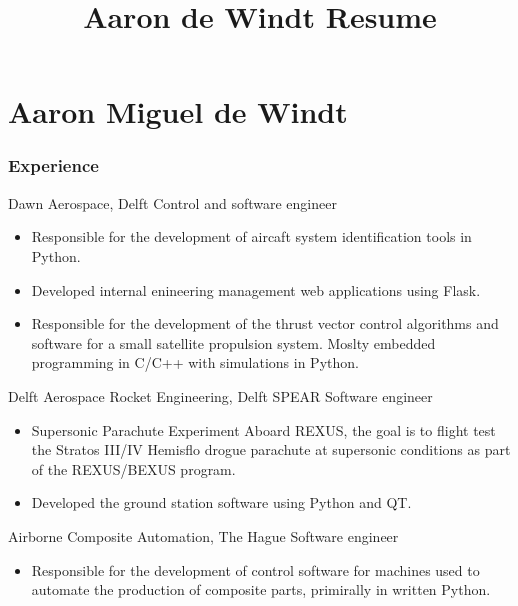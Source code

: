 \documentclass{tccv}
\title{Aaron de Windt Resume}
\begin{document}
\part{Aaron Miguel de Windt}

\section{Experience}

\begin{eventlist}


    {Dawn Aerospace, Delft}
    {Control and software engineer}
\begin{itemize}
   \item{Responsible for the development of aircaft system \linebreak identification tools in Python.}
   \item{Developed internal enineering management web applications using Flask.}
   \item{Responsible for the development of the thrust vector control algorithms and software for a small satellite propulsion system. Moslty embedded programming in C/C++ with simulations in Python.}
\end{itemize}

     {Delft Aerospace Rocket Engineering, Delft}
     {SPEAR Software engineer}
\begin{itemize}
    \item{Supersonic Parachute Experiment Aboard REXUS, the goal is to flight test the Stratos III/IV Hemisflo drogue parachute at supersonic conditions as part of the REXUS/BEXUS program.}
    \item{Developed the ground station software using Python and QT.}
\end{itemize}

     {Airborne Composite Automation, The Hague}
     {Software engineer}
\begin{itemize}
    \item{Responsible for the development of control software for machines used to automate the production of composite parts, primirally in written Python.}
\end{itemize}


\end{eventlist}
\end{document}
